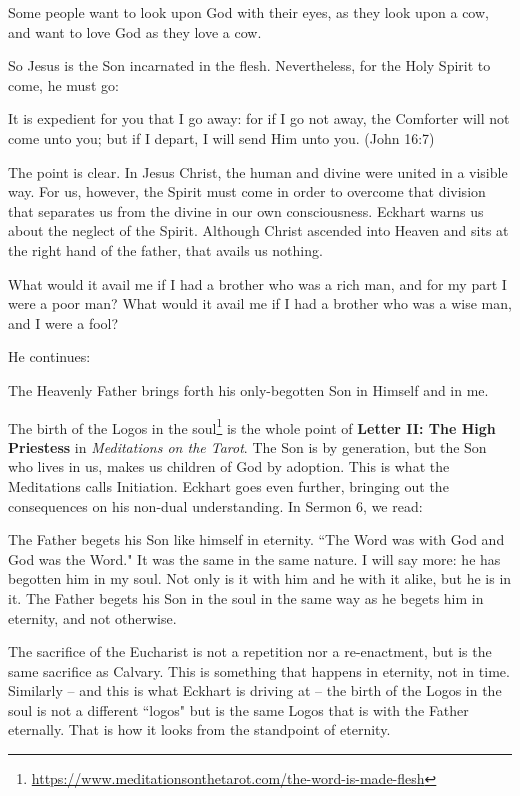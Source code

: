 \begin{quotex}
Some people want to look upon God with their eyes, as they look upon a cow, and want to love God as they love a cow. 

\end{quotex}
So Jesus is the Son incarnated in the flesh. Nevertheless, for the Holy Spirit to come, he must go:

\begin{quotex}
It is expedient for you that I go away: for if I go not away, the Comforter will not come unto you; but if I depart, I will send Him unto you. (John 16:7) 

\end{quotex}
The point is clear. In Jesus Christ, the human and divine were united in a visible way. For us, however, the Spirit must come in order to overcome that division that separates us from the divine in our own consciousness. Eckhart warns us about the neglect of the Spirit. Although Christ ascended into Heaven and sits at the right hand of the father, that avails us nothing.

\begin{quotex}
What would it avail me if I had a brother who was a rich man, and for my part I were a poor man? What would it avail me if I had a brother who was a wise man, and I were a fool? 

\end{quotex}
He continues:

\begin{quotex}
The Heavenly Father brings forth his only-begotten Son in Himself and in me. 

\end{quotex}
The birth of the Logos in the soul\footnote{\url{https://www.meditationsonthetarot.com/the-word-is-made-flesh}} is the whole point of \textbf{Letter II: The High Priestess} in \emph{Meditations on the Tarot}. The Son is by generation, but the Son who lives in us, makes us children of God by adoption. This is what the Meditations calls Initiation. Eckhart goes even further, bringing out the consequences on his non-dual understanding. In Sermon 6, we read:

\begin{quotex}
The Father begets his Son like himself in eternity. ``The Word was with God and God was the Word." It was the same in the same nature. I will say more: he has begotten him in my soul. Not only is it with him and he with it alike, but he is in it. The Father begets his Son in the soul in the same way as he begets him in eternity, and not otherwise. 

\end{quotex}
The sacrifice of the Eucharist is not a repetition nor a re-enactment, but is the same sacrifice as Calvary. This is something that happens in eternity, not in time. Similarly – and this is what Eckhart is driving at – the birth of the Logos in the soul is not a different ``logos" but is the same Logos that is with the Father eternally. That is how it looks from the standpoint of eternity.


